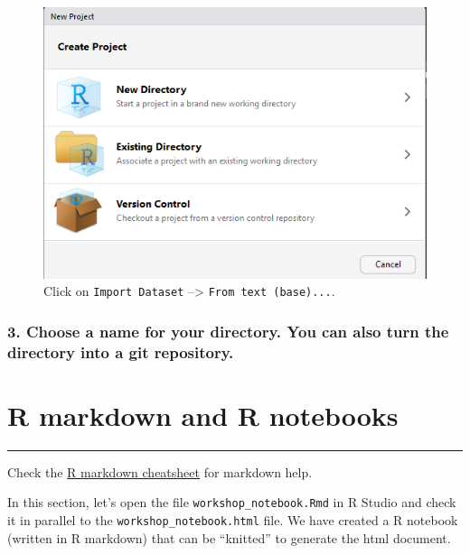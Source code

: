 \documentclass[
]{article}
\begin{document}
\begin{figure}
\centering
\includegraphics{imgs/RProject1.PNG}
\caption{Click on \texttt{Import\ Dataset} --\textgreater{}
\texttt{From\ text\ (base)...}.}
\end{figure}

\hypertarget{choose-a-name-for-your-directory.-you-can-also-turn-the-directory-into-a-git-repository.}{%
\subsubsection{3. Choose a name for your directory. You can also turn
the directory into a git
repository.}\label{choose-a-name-for-your-directory.-you-can-also-turn-the-directory-into-a-git-repository.}}

\hypertarget{r-markdown-and-r-notebooks}{%
\section{R markdown and R notebooks}\label{r-markdown-and-r-notebooks}}

\begin{center}\rule{0.5\linewidth}{\linethickness}\end{center}

Check the \href{https://www.rstudio.com/resources/cheatsheets/}{R
markdown cheatsheet} for markdown help.

In this section, let's open the file \texttt{workshop\_notebook.Rmd} in
R Studio and check it in parallel to the
\texttt{workshop\_notebook.html} file. We have created a R notebook
(written in R markdown) that can be ``knitted'' to generate the html
document.
\end{document}
